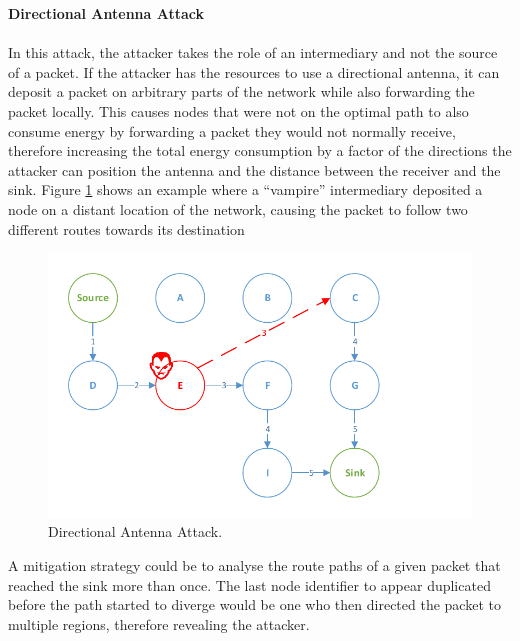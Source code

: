 \documentclass{sig-alternate-05-2015}
\begin{document}
\textbf{Directional Antenna Attack}\\\\
In this attack, the attacker takes the role of an intermediary and not the source of a packet. If the attacker has the resources to use a directional antenna, it can deposit a packet on arbitrary parts of the network while also forwarding the packet locally. This causes nodes that were not on the optimal path to also consume energy by forwarding a packet they would not normally receive, therefore increasing the total energy consumption by a factor of the directions the attacker can position the antenna and the distance between the receiver and the sink. Figure \ref{fig:directional_antenna_attack} shows an example where a ``vampire'' intermediary deposited a node on a distant location of the network, causing the packet to follow two different routes towards its destination

\begin{figure}[h]
  \centering
  \includegraphics[width=0.8\linewidth]{figures/Directional_Antenna_Attack.pdf}
  \caption{Directional Antenna Attack.}
  \label{fig:directional_antenna_attack}
\end{figure}

A mitigation strategy could be to analyse the route paths of a given packet that reached the sink more than once. The last node identifier to appear duplicated before the path started to diverge would be one who then directed the packet to multiple regions, therefore revealing the attacker.
\end{document}
